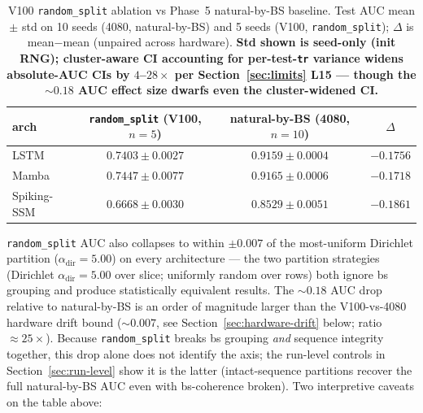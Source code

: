 \documentclass[journal]{IEEEtran}
\newcommand{\alphadir}{\ensuremath{\alpha_{\mathrm{dir}}}}
\begin{document}
\begin{table}[t]
\caption{V100 \lstinline|random_split| ablation vs Phase~5 natural-by-BS baseline. Test AUC mean $\pm$ std on 10 seeds (4080, natural-by-BS) and 5 seeds (V100, \lstinline|random_split|); $\Delta$ is mean$-$mean (unpaired across hardware). \textbf{Std shown is seed-only (init RNG); cluster-aware CI accounting for per-test-\lstinline|tr| variance widens absolute-AUC CIs by $4$--$28\times$ per Section~\ref{sec:limits} L15 — though the $\sim 0.18$ AUC effect size dwarfs even the cluster-widened CI.}}
\label{tab:random-split-ablation}
\centering
\begin{tabular}{@{}lccc@{}}
\toprule
arch & \lstinline|random_split| (V100, $n=5$) & natural-by-BS (4080, $n=10$) & $\Delta$ \\
\midrule
LSTM        & $0.7403 \pm 0.0027$ & $0.9159 \pm 0.0004$ & $\boldsymbol{-0.1756}$ \\
Mamba       & $0.7447 \pm 0.0077$ & $0.9165 \pm 0.0006$ & $\boldsymbol{-0.1718}$ \\
Spiking-SSM & $0.6668 \pm 0.0030$ & $0.8529 \pm 0.0051$ & $\boldsymbol{-0.1861}$ \\
\bottomrule
\end{tabular}
\end{table}

\lstinline|random_split| AUC also collapses to within $\pm 0.007$ of the most-uniform Dirichlet partition ($\alphadir = 5.00$) on every architecture --- the two partition strategies (Dirichlet $\alphadir = 5.00$ over slice; uniformly random over rows) both ignore bs grouping and produce statistically equivalent results. The $\sim 0.18$ AUC drop relative to natural-by-BS is an order of magnitude larger than the V100-vs-4080 hardware drift bound ($\sim 0.007$, see Section~\ref{sec:hardware-drift} below; ratio $\approx 25\times$). Because \lstinline|random_split| breaks bs grouping \emph{and} sequence integrity together, this drop alone does not identify the axis; the run-level controls in Section~\ref{sec:run-level} show it is the latter (intact-sequence partitions recover the full natural-by-BS AUC even with bs-coherence broken). Two interpretive caveats on the table above:
\end{document}
